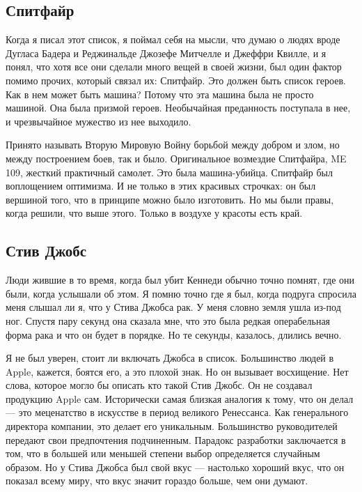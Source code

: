 \documentclass[ebook,12pt,oneside,openany]{memoir}
\begin{document}
\subsection{Спитфайр}

Когда я писал этот список, я поймал себя на мысли, что думаю о людях
вроде Дугласа Бадера и Реджинальде Джозефе Митчелле и Джеффри Квилле,
и я понял, что хотя все они сделали много вещей в своей жизни, был
один фактор помимо прочих, который связал их: Спитфайр. Это должен
быть список героев. Как в нем может быть машина? Потому что эта машина
была не просто машиной. Она была призмой героев. Необычайная
преданность поступала в нее, и чрезвычайное мужество из нее выходило. \newline

Принято называть Вторую Мировую Войну борьбой между добром и злом, но
между построением боев, так и было. Оригинальное возмездие Спитфайра,
ME 109, жесткий практичный самолет. Это была машина-убийца. Спитфайр
был воплощением оптимизма. И не только в этих красивых строчках: он
был вершиной того, что в принципе можно было изготовить. Но мы были
правы, когда решили, что выше этого. Только в воздухе у красоты есть
край. \newline

\subsection{Стив Джобс}

Люди жившие в то время, когда был убит Кеннеди обычно точно помнят,
где они были, когда услышали об этом. Я помню точно где я был, когда
подруга спросила меня слышал ли я, что у Стива Джобса рак. У меня
словно земля ушла из-под ног. Спустя пару секунд она сказала мне, что
это была редкая операбельная форма рака и что он будет в порядке. Но
те секунды, казалось, длились вечно. \newline

Я не был уверен, стоит ли включать Джобса в список. Большинство людей
в Apple, кажется, боятся его, а это плохой знак. Но он вызывает
восхищение. Нет слова, которое могло бы описать кто такой Стив Джобс.
Он не создавал продукцию Apple сам. Исторически самая близкая аналогия
к тому, что он делал — это меценатство в искусстве в период великого
Ренессанса. Как генерального директора компании, это делает его
уникальным. Большинство руководителей передают свои предпочтения
подчиненным. Парадокс разработки заключается в том, что в большей или
меньшей степени выбор определяется случайным образом. Но у Стива
Джобса был свой вкус — настолько хороший вкус, что он показал всему
миру, что вкус значит гораздо больше, чем они думают. \newline
\end{document}
